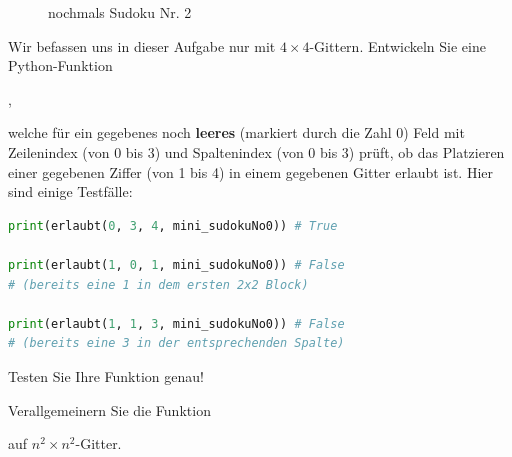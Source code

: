 \begin{figure}[H]
	\caption{nochmals Sudoku Nr. 2}
	\label{fig:sudoku0again}
\end{figure}

\clearpage
\begin{myexercise}\label{myexercise:0688}
	Wir befassen uns in dieser Aufgabe nur mit $4\times 4$-Gittern. Entwickeln Sie eine Python-Funktion
	\begin{center}
		,
	\end{center}
	welche für ein gegebenes noch \textbf{leeres} (markiert durch die Zahl 0) Feld mit Zeilenindex  (von 0 bis 3) und Spaltenindex  (von 0 bis 3) prüft, ob das Platzieren einer gegebenen Ziffer  (von 1 bis 4) in einem gegebenen Gitter erlaubt ist. Hier sind einige Testfälle:
	\begin{lstlisting}[language=Python,caption=erlaubt oder nicht,numbers=none]
print(erlaubt(0, 3, 4, mini_sudokuNo0)) # True

print(erlaubt(1, 0, 1, mini_sudokuNo0)) # False
# (bereits eine 1 in dem ersten 2x2 Block)

print(erlaubt(1, 1, 3, mini_sudokuNo0)) # False
# (bereits eine 3 in der entsprechenden Spalte)
\end{lstlisting}
	Testen Sie Ihre Funktion genau!
\end{myexercise}

\begin{myexercise}\label{myexercise:0689}
	Verallgemeinern Sie die Funktion
	\begin{center}
	\end{center}
	auf $n^2\times n^2$-Gitter.
\end{myexercise}


